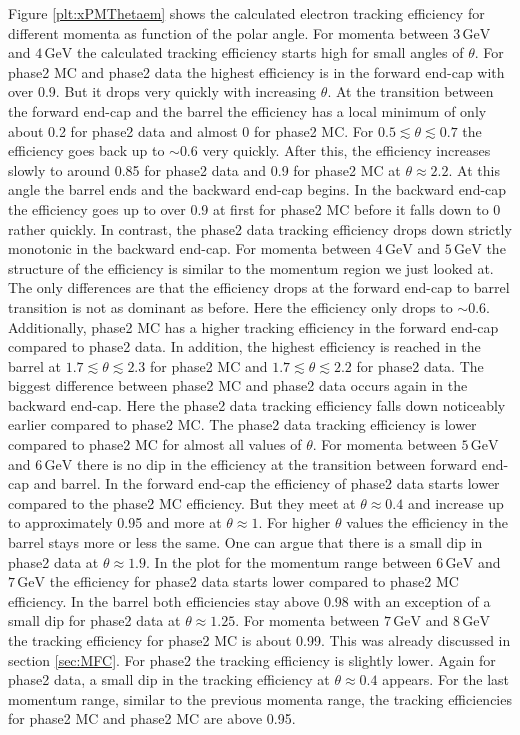 \documentclass[a4paper,11pt,twosided,final,german,openbib,pdftex,listof=totoc,bibliography=totoc]{scrbook}
\begin{document}
Figure \ref{plt:xPMThetaem} shows the calculated electron tracking efficiency for different momenta as function of the polar angle. For momenta between $3\,\textrm{GeV}$ and $4\,\textrm{GeV}$ the calculated tracking efficiency starts high for small angles of $\theta$. For phase2 MC and phase2 data the highest efficiency is in the forward end-cap with over 0.9. But it drops very quickly with increasing $\theta$. At the transition between the forward end-cap and the barrel the efficiency has a local minimum of only  about 0.2 for phase2 data and almost 0 for phase2 MC.
For $0.5 \lesssim \theta \lesssim 0.7$ the efficiency goes back up to $\sim 0.6$ very quickly. After this, the efficiency increases slowly to around 0.85 for phase2 data and 0.9 for phase2 MC at $\theta \approx 2.2$. At this angle the barrel ends and the backward end-cap begins. 
In the backward end-cap the efficiency goes up to over 0.9 at first for phase2 MC before it falls down to 0 rather quickly. In contrast, the phase2 data tracking efficiency drops down strictly monotonic in the backward end-cap. 
For momenta between $4\,\textrm{GeV}$ and $5\,\textrm{GeV}$ the structure of the efficiency is similar to the momentum region we just looked at. The only differences are that the efficiency drops at the forward end-cap to barrel transition is not as dominant as before. Here the efficiency only drops to $\sim 0.6$. Additionally, phase2 MC has a higher tracking efficiency in the forward end-cap compared to phase2 data.
In addition, the highest efficiency is reached in the barrel at $1.7 \lesssim \theta \lesssim 2.3$ for phase2 MC and $1.7 \lesssim \theta  \lesssim 2.2$ for phase2 data. The biggest difference between phase2 MC and phase2 data occurs again in the backward end-cap. Here the phase2 data tracking efficiency falls down noticeably earlier compared to phase2 MC. The phase2 data tracking efficiency is lower compared to phase2 MC for almost all values of $\theta$.
For momenta between $5\,\textrm{GeV}$ and $6\,\textrm{GeV}$ there is no dip in the efficiency at the transition between forward end-cap and barrel. In the forward end-cap the efficiency of phase2 data starts lower compared to the phase2 MC efficiency. But they meet at $\theta \approx 0.4$  and increase up to approximately 0.95 and more at $\theta \approx 1$.
For higher $\theta$ values the efficiency in the barrel stays more or less the same. One can argue that there is a small dip in phase2 data at $\theta \approx 1.9$.
In the plot for the momentum range between $6\,\textrm{GeV}$ and $7\,\textrm{GeV}$ the efficiency for phase2 data starts lower compared to phase2 MC efficiency. In the barrel both efficiencies stay above 0.98 with an exception of a small dip for phase2 data at $\theta \approx 1.25$. 
For momenta  between $7\,\textrm{GeV}$ and $8\,\textrm{GeV}$ the tracking efficiency for phase2 MC is about 0.99. This was already discussed in section \ref{sec:MFC}. For phase2 the tracking efficiency is slightly lower. Again for phase2 data, a small dip in the tracking efficiency at $\theta \approx 0.4$ appears. 
For the last momentum range, similar to the previous momenta range, the tracking efficiencies for phase2 MC and phase2 MC are above 0.95.
 
\end{document}

